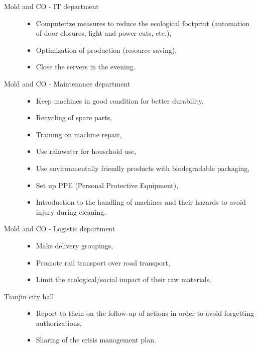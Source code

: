 \begin{description}
    \item[Mold and CO - IT department]
    \begin{itemize}
        \item Computerize measures to reduce the ecological footprint (automation of door closures, light and power cuts, etc.),
        \item Optimization of production (resource saving),
        \item Close the servers in the evening.
    \end{itemize} 
\end{description}  

\begin{description}
    \item[Mold and CO - Maintenance department]
    \begin{itemize}
        \item Keep machines in good condition for better durability,
        \item Recycling of spare parts,
        \item Training on machine repair,
        \item Use rainwater for household use,
        \item Use environmentally friendly products with biodegradable packaging,
        \item Set up PPE (Personal Protective Equipment),
        \item Introduction to the handling of machines and their hazards to avoid injury during cleaning.
    \end{itemize} 
\end{description}  

\begin{description}
    \item[Mold and CO - Logistic department]
    \begin{itemize}
        \item Make delivery groupings,
        \item Promote rail transport over road transport,
        \item Limit the ecological/social impact of their raw materials.
    \end{itemize} 
\end{description}  

\begin{description}
    \item[Tianjin city hall]
    \begin{itemize}
        \item Report to them on the follow-up of actions in order to avoid forgetting authorizations,
        \item Sharing of the crisis management plan.
    \end{itemize} 
\end{description}  


